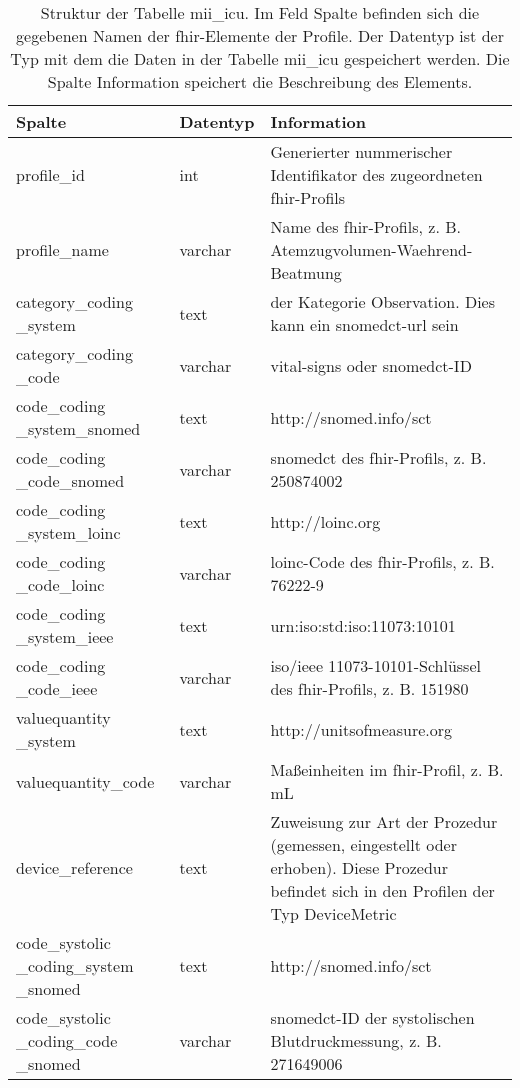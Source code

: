 \begin{longtable}{|p{3.5cm}|l|p{6.7cm}|}
	\caption[Struktur der Tabelle mii\_icu]{Struktur der Tabelle mii\_icu. Im Feld Spalte befinden sich die gegebenen Namen der \ac{fhir}-Elemente der Profile. Der Datentyp ist der Typ mit dem die Daten in der Tabelle mii\_icu gespeichert werden. Die Spalte Information speichert die Beschreibung des Elements.} \label{tab:miiicu}
	\endfirsthead
		\hline
		\bfseries Spalte & \bfseries Datentyp & \bfseries Information \\ \hline
		profile\_id & int & Generierter nummerischer Identifikator des zugeordneten \ac{fhir}-Profils \\ \hline
		profile\_name & varchar & Name des \ac{fhir}-Profils, z. B. Atemzugvolumen-Waehrend-Beatmung \\ \hline
		category\_coding \_system & text & \acsu{url} der Kategorie \glqq Observation\grqq{}. Dies kann ein \ac{snomedct}-\ac{url} sein \\ \hline
		category\_coding \_code & varchar & \glqq vital-signs\grqq{} oder \ac{snomedct}-ID \\ \hline
		code\_coding \_system\_snomed & text & http://snomed.info/sct \\ \hline 
		code\_coding \_code\_snomed & varchar & \ac{snomedct} des \ac{fhir}-Profils, z. B. 250874002 \\ \hline
		code\_coding \_system\_loinc & text & http://loinc.org \\ \hline
		code\_coding \_code\_loinc & varchar & \ac{loinc}-Code des \ac{fhir}-Profils, z. B. 76222-9 \\ \hline
		code\_coding \_system\_ieee & text & urn:iso:std:iso:11073:10101 \\ \hline
		code\_coding \_code\_ieee & varchar & \ac{iso}/\ac{ieee} 11073-10101\texttrademark{}-Schlüssel des \ac{fhir}-Profils, z. B. 151980 \\ \hline
		valuequantity \_system & text & http://unitsofmeasure.org \\ \hline
		valuequantity\_code & varchar & Maßeinheiten im \ac{fhir}-Profil, z. B. mL \\ \hline
		device\_reference & text & Zuweisung zur Art der Prozedur (gemessen, eingestellt oder erhoben). Diese Prozedur befindet sich in den Profilen der Typ \glqq DeviceMetric\grqq{} \\ \hline
		code\_systolic \_coding\_system \_snomed & text & http://snomed.info/sct \\ \hline
		code\_systolic \_coding\_code \_snomed & varchar & \ac{snomedct}-ID der systolischen Blutdruckmessung, z. B. 271649006 \\ \hline

\end{longtable}
